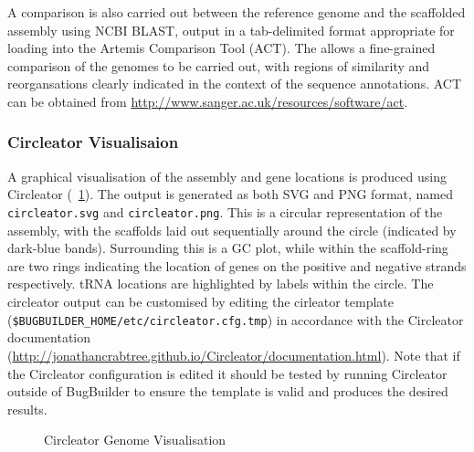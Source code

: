 \documentclass[a4paper,10pt]{article}
\begin{document}
A comparison is also carried out between the reference genome and the
scaffolded assembly using NCBI BLAST, output in a tab-delimited format
appropriate for loading into the Artemis Comparison Tool (ACT). The allows a
fine-grained comparison of the genomes to be carried out, with regions of
similarity and reorgansations clearly indicated in the context of the sequence
annotations. ACT can be obtained from 
\href{http://www.sanger.ac.uk/resource/software/act}{http://www.sanger.ac.uk/resources/software/act}. 

\subsubsection{Circleator Visualisaion}

A graphical visualisation of the assembly and gene locations is produced using
Circleator (~\ref{fig:circleator}). The output is generated as both SVG and PNG format, named {\tt
circleator.svg} and {\tt circleator.png}. This is a circular representation of
the assembly, with the scaffolds laid out sequentially around the circle
(indicated by dark-blue bands). Surrounding this is a GC plot, while within
the scaffold-ring are two rings indicating the location of genes on the
positive and negative strands respectively. tRNA locations are highlighted by
labels within the circle. The circleator output can be customised by editing
the cirleator template ({\tt \$BUGBUILDER\_HOME\slash etc\slash circleator.cfg.tmp}) in accordance
with the Circleator documentation
(\href{http://jonathancrabtree.github.io/Circleator/documentation.html}{http://jonathancrabtree.github.io/Circleator/documentation.html}).
Note that if the Circleator configuration is edited it should be tested by
running Circleator outside of BugBuilder to ensure the template is valid and
produces the desired results.

\begin{figure}[ht] 
  \centering
  \caption{Circleator Genome Visualisation} 
  \label{fig:circleator} 
\end{figure}
\end{document}
